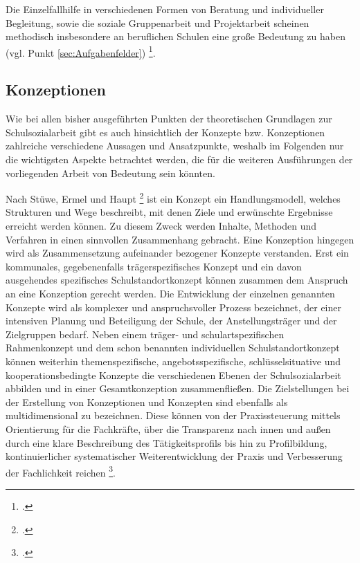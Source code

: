 Die Einzelfallhilfe in verschiedenen Formen von Beratung und individueller Begleitung, sowie die soziale Gruppenarbeit und Projektarbeit scheinen methodisch insbesondere an beruflichen Schulen eine große Bedeutung zu haben (vgl. Punkt \ref{sec:Aufgabenfelder}) \footcite[vgl.][10ff]{LSS2004}. 

\subsection{Konzeptionen}
\label{sec:Konzeptionen}

Wie bei allen bisher ausgeführten Punkten der theoretischen Grundlagen zur Schulsozialarbeit gibt es auch hinsichtlich der Konzepte bzw. Konzeptionen zahlreiche verschiedene Aussagen und Ansatzpunkte, weshalb im Folgenden nur die wichtigsten Aspekte betrachtet werden, die für die weiteren Ausführungen der vorliegenden Arbeit von Bedeutung sein könnten. 

Nach Stüwe, Ermel und Haupt \footcite[vgl.][148]{Stuewe2015} ist ein Konzept ein Handlungsmodell, welches Strukturen und Wege beschreibt, mit denen Ziele und erwünschte Ergebnisse erreicht werden können. Zu diesem Zweck werden Inhalte, Methoden und Verfahren in einen sinnvollen Zusammenhang gebracht. Eine Konzeption hingegen wird als Zusammensetzung aufeinander bezogener Konzepte verstanden. Erst ein kommunales, gegebenenfalls trägerspezifisches Konzept und ein davon ausgehendes spezifisches Schulstandortkonzept können zusammen dem Anspruch an eine Konzeption gerecht werden. Die Entwicklung der einzelnen genannten Konzepte wird als komplexer und anspruchsvoller Prozess bezeichnet, der einer intensiven Planung und Beteiligung der Schule, der Anstellungsträger und der Zielgruppen bedarf. Neben einem träger- und schulartspezifischen Rahmenkonzept und dem schon benannten individuellen Schulstandortkonzept können weiterhin themenspezifische, angebotsspezifische, schlüsselsituative und kooperationsbedingte Konzepte die verschiedenen Ebenen der Schulsozialarbeit abbilden und in einer Gesamtkonzeption zusammenfließen. Die Zielstellungen bei der Erstellung von Konzeptionen und Konzepten sind ebenfalls als multidimensional zu bezeichnen. Diese können von der Praxissteuerung mittels Orientierung für die Fachkräfte, über die Transparenz nach innen und außen durch eine klare Beschreibung des Tätigkeitsprofils bis hin zu Profilbildung, kontinuierlicher systematischer Weiterentwicklung der Praxis und Verbesserung der Fachlichkeit reichen \footcite[vgl.][148ff]{Stuewe2015}.

